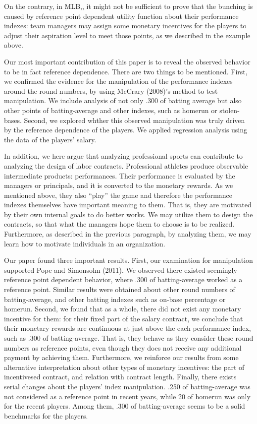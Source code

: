 \documentclass[dvipdfmx, 12pt]{article}
\begin{document}
On the contrary, in MLB,, it might not be sufficient to prove that the bunching is caused by reference point dependent utility function about their performance indexes: team managers may assign some monetary incentives for the players to adjust their aspiration level to meet those points, as we described in the example above.

Our most important contribution of this paper is to reveal the observed behavior to be in fact reference dependence. There are two things to be mentioned. First, we confirmed the evidence for the manipulation of the performance indexes around the round numbers, by using McCrary (2008)'s method to test manipulation. We include analysis of not only .300 of batting average but also other points of batting-average and other indexes, such as homerun or stolen-bases. Second, we explored whther this observed manipulation was truly driven by the reference dependence of the players. We applied regression analysis using the data of the players' salary.

In addition, we here argue that analyzing professional sports can contribute to analyzing the design of labor contracts. Professional athletes produce observable intermediate products: performances. Their performance is evaluated by the managers or principals, and it is converted to the monetary rewards. As we mentioned above, they also ``play'' the game and therefore the performance indexes themselves have important meaning to them. That is, they are motivated by their own internal goals to do better works. We may utilize them to design the contracts, so that what the managers hope them to choose is to be realized. Furthermore, as described in the previous paragraph, by analyzing them, we may learn how to motivate individuals in an organization.

Our paper found three important results. First, our examination for manipulation supported Pope and Simonsohn (2011). We observed there  existed seemingly reference point dependent behavior, where .300 of batting-average worked as a reference point. Similar results were obtained about other round numbers of batting-average, and other batting indexes such as on-base percentage or homerun. Second, we found that as a whole, there did not exist any monetary incentive for them: for their fixed part of the salary contract, we conclude that their monetary rewards are continuous at just above the each performance index, such as .300 of batting-average. That is, they behave as they consider these round numbers as reference points, even though they does not receive any additional payment by achieving them. Furthermore, we reinforce our results from some alternative interpretation about other types of monetary incentives: the part of incentivesed contract, and relation with contract length. Finally, there exists serial changes about the players' index manipulation. .250 of batting-average was not considered as a reference point in recent years, while 20 of homerun was only for the recent players. Among them, .300 of batting-average seems to be a solid benchmarks for the players.
\end{document}
